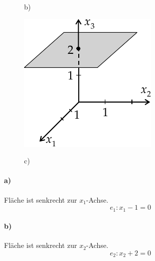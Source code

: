 \documentclass{ajc}
\numberwithin{equation}{subsection}
\begin{document}
\begin{figure}[ht]
\begin{minipage}[b]{0.2\textwidth}
			\label{fig:009_flache2}
			\begin{center}
				b)
			\end{center}
		\end{minipage}
		\hfill
		\begin{minipage}[b]{0.2\textwidth}
			\includegraphics[width=\textwidth]{ma_010_flache3.pdf}
			\label{fig:010_flache3}
			\begin{center}
				c)
			\end{center}
		\end{minipage}
	\end{figure}
	
	\paragraph{a)} Fläche ist senkrecht zur $x_1$-Achse.
	\begin{equation}
		e_1: x_1 - 1 = 0
	\end{equation}
	
	\paragraph{b)} Fläche ist senkrecht zur $x_2$-Achse.
	\begin{equation}
		e_2: x_2 + 2 = 0
	\end{equation}
	
\end{document}

